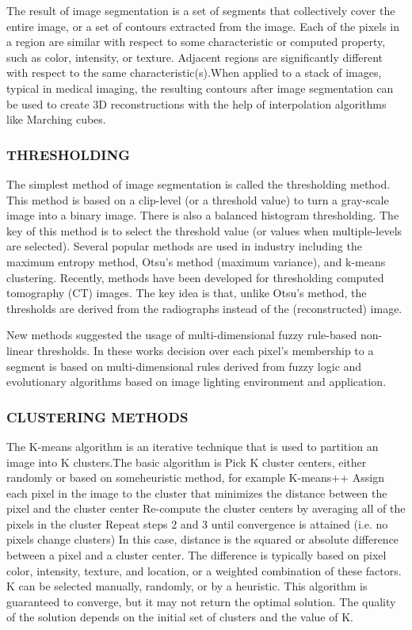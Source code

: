 The result of image segmentation is a set of segments that collectively cover the entire image, or a set of contours extracted from the image. Each of the pixels in a region are similar with respect to some characteristic or computed property, such as color, intensity, or texture. Adjacent regions are significantly different with respect to the same characteristic(s).When applied to a stack of images, typical in medical imaging, the resulting contours after image segmentation can be used to create 3D reconstructions with the help of interpolation algorithms like Marching cubes.

\subsubsection{THRESHOLDING}
The simplest method of image segmentation is called the thresholding method. This method is based on a clip-level (or a threshold value) to turn a gray-scale image into a binary image. There is also a balanced histogram thresholding.
The key of this method is to select the threshold value (or values when multiple-levels are selected). Several popular methods are used in industry including the maximum entropy method, Otsu's method (maximum variance), and k-means clustering.
Recently, methods have been developed for thresholding computed tomography (CT) images. The key idea is that, unlike Otsu's method, the thresholds are derived from the radiographs instead of the (reconstructed) image.

New methods suggested the usage of multi-dimensional fuzzy rule-based non-linear thresholds. In these works decision over each pixel's membership to a segment is based on multi-dimensional rules derived from fuzzy logic and evolutionary algorithms based on image lighting environment and application.

\subsubsection{CLUSTERING METHODS}
The K-means algorithm is an iterative technique that is used to partition an image into K clusters.The basic algorithm is
Pick K cluster centers, either randomly or based on someheuristic method, for example K-means++
Assign each pixel in the image to the cluster that minimizes the distance between the pixel and the cluster center
Re-compute the cluster centers by averaging all of the pixels in the cluster
Repeat steps 2 and 3 until convergence is attained (i.e. no pixels change clusters)
In this case, distance is the squared or absolute difference between a pixel and a cluster center. The difference is typically based on pixel color, intensity, texture, and location, or a weighted combination of these factors. K can be selected manually, randomly, or by a heuristic. This algorithm is guaranteed to converge, but it may not return the optimal solution. The quality of the solution depends on the initial set of clusters and the value of K.

